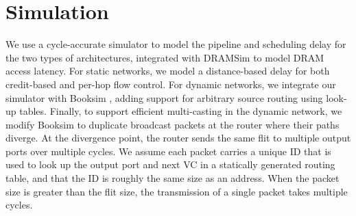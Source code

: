 \section{Simulation}
We use a cycle-accurate simulator to model the pipeline and scheduling delay for the two types of architectures,
 integrated with DRAMSim \cite{dramsim} to model DRAM access latency. For static networks, we model
a distance-based delay for both credit-based and per-hop flow control. 
For dynamic networks, we integrate
our simulator with Booksim \cite{jiang2013detailed}, adding support for arbitrary source routing using look-up tables. 
Finally, to support efficient multi-casting in the dynamic network, we modify Booksim to duplicate broadcast packets at the router where their paths diverge.
At the divergence point, the router sends the same flit to multiple output ports over multiple cycles.
We assume each packet carries a unique ID that is used to look up the output port and next VC in a statically generated routing table, and that the ID is roughly the same size as an address.
When the packet size is greater than the flit size, the transmission of a single packet takes multiple cycles.

